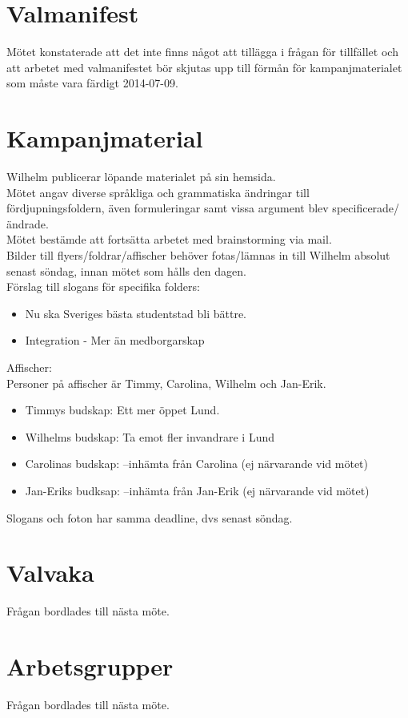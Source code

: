 \documentclass[a4paper,10pt]{article}
\begin{document}
\section{Valmanifest}
Mötet konstaterade att det inte finns något att tillägga i frågan för tillfället och att arbetet med valmanifestet bör skjutas upp till förmån för kampanjmaterialet som måste vara färdigt 2014-07-09.

\section{Kampanjmaterial}
Wilhelm publicerar löpande materialet på sin hemsida. \\
Mötet angav diverse språkliga och grammatiska ändringar till fördjupningsfoldern, även formuleringar samt vissa argument blev specificerade/ändrade. \\
Mötet bestämde att fortsätta arbetet med brainstorming via mail. \\
Bilder till flyers/foldrar/affischer behöver fotas/lämnas in till Wilhelm absolut senast söndag, innan mötet som hålls den dagen. \\
Förslag till slogans för specifika folders:
\begin{itemize}
\item Nu ska Sveriges bästa studentstad bli bättre.
\item Integration - Mer än medborgarskap
\end{itemize}
Affischer: \\
Personer på affischer är Timmy, Carolina, Wilhelm och Jan-Erik. \\
\begin{itemize}
\item Timmys budskap: Ett mer öppet Lund.
\item Wilhelms budskap: Ta emot fler invandrare i Lund
\item Carolinas budskap: --inhämta från Carolina (ej närvarande vid mötet)
\item Jan-Eriks budksap: --inhämta från Jan-Erik (ej närvarande vid mötet)
\end{itemize}
Slogans och foton har samma deadline, dvs senast söndag.

\section{Valvaka}
Frågan bordlades till nästa möte.

\section{Arbetsgrupper}
Frågan bordlades till nästa möte.
\end{document}
